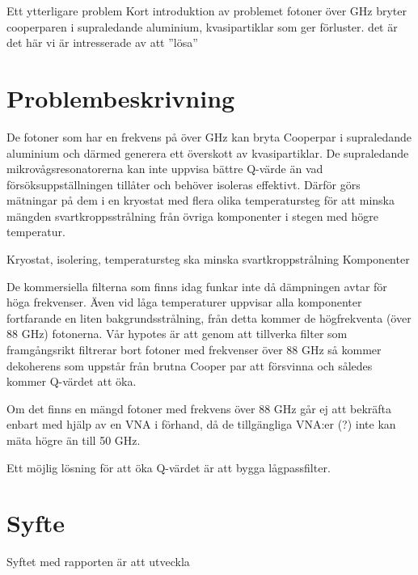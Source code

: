 \documentclass[main.tex]{subfiles}
\begin{document}
Ett ytterligare problem Kort introduktion av problemet
fotoner över \unit[88]{GHz} bryter cooperparen i supraledande aluminium, kvasipartiklar som ger förluster.
det är det här vi är intresserade av att ''lösa''

\section{Problembeskrivning}
De fotoner som har en frekvens på över \unit[88]{GHz} kan bryta Cooperpar i supraledande aluminium och därmed generera ett överskott av kvasipartiklar. De supraledande mikrovågsresonatorerna kan inte uppvisa bättre Q-värde än vad försöksuppställningen tillåter och behöver isoleras effektivt. Därför görs mätningar på dem i en kryostat med flera olika temperatursteg för att minska mängden svartkroppsstrålning från övriga komponenter i stegen med högre temperatur. 


Kryostat, isolering, temperatursteg ska minska svartkroppstrålning Komponenter

De kommersiella filterna som finns idag funkar inte då dämpningen avtar för höga frekvenser. Även vid låga temperaturer uppvisar alla komponenter fortfarande en liten bakgrundsstrålning, från detta kommer de högfrekventa (över 88 GHz) fotonerna. Vår hypotes är att genom att tillverka filter som framgångsrikt filtrerar bort fotoner med frekvenser över 88 GHz så kommer dekoherens som uppstår från brutna Cooper par att försvinna och således kommer Q-värdet att öka.


Om det finns en mängd fotoner med frekvens över 88 GHz går ej att bekräfta enbart med hjälp av en VNA i förhand, då de tillgängliga VNA:er (?) inte kan mäta högre än till 50 GHz.



Ett möjlig lösning för att öka Q-värdet är att bygga lågpassfilter. 

\section{Syfte}
Syftet med rapporten är att utveckla 

\end{document}
